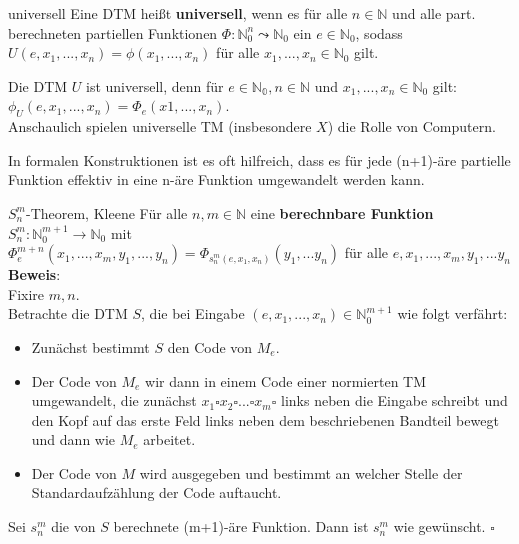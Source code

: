\begin{defn}{universell}
    Eine DTM heißt \textbf{universell}, wenn es für alle $n \in \mathbb{N}$ und alle part. berechneten 
    partiellen Funktionen $\Phi : \mathbb{N}_0^n \leadsto \mathbb{N}_0$ ein $e \in \mathbb{N}_0$, sodass
    $U(e,x_1,...,x_n) = \phi(x_1,...,x_n)$ für alle $x_1,...,x_n \in \mathbb{N}_0$ gilt. 
\end{defn}

\begin{bem}
    Die DTM $U$ ist universell, denn für $e \in \mathbb{N_0}, n \in \mathbb{N}$ und $x_1,...,x_n \in \mathbb{N}_0$ gilt: \\
    $\phi_U(e,x_1,...,x_n) = \Phi_e(x1,...,x_n)$. \\

    Anschaulich spielen universelle TM (insbesondere $X$) die Rolle von Computern.
\end{bem}

In formalen Konstruktionen ist es oft hilfreich, dass es für jede (n+1)-äre partielle Funktion effektiv in eine n-äre
Funktion umgewandelt werden kann.

\begin{satz}{$S^m_n$-Theorem, Kleene}
    Für alle $n,m \in \mathbb{N}$ eine \textbf{berechnbare Funktion} $S^m_n : \mathbb{N}_0^{m+1} \rightarrow \mathbb{N}_0$ mit \\
    $\Phi^{m+n}_e(x_1,...,x_m,y_1,...,y_n) = \Phi_{s^m_n(e,x_1,x_n)}(y_1,...y_n)$ für alle $e,x_1,...,x_m,y_1,...y_n$ \\

    \textbf{Beweis}:\\
    Fixire $m,n$. \\
    Betrachte die DTM $S$, die bei Eingabe $(e,x_1,...,x_n) \in \mathbb{N}^{m+1}_0$ wie folgt verfährt:
    \begin{itemize}
        \item Zunächst bestimmt $S$ den Code von $M_e$.
        \item Der Code von $M_e$ wir dann in einem Code einer normierten TM umgewandelt,
              die zunächst $x_1 \square x_2 \square ... \square x_m \square$ links neben
              die Eingabe schreibt und den Kopf auf das erste Feld links neben dem beschriebenen
              Bandteil bewegt und dann wie $M_e$ arbeitet.
        \item Der Code von $M$ wird ausgegeben und bestimmt an welcher Stelle der Standardaufzählung
              der Code auftaucht.
    \end{itemize}
    Sei $s^m_n$ die von $S$ berechnete (m+1)-äre Funktion. Dann ist $s^m_n$ wie gewünscht. $\square$
\end{satz}
